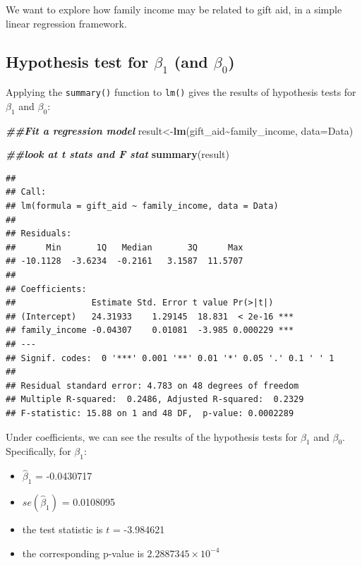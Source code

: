 \documentclass[
]{book}
\newenvironment{Shaded}{\begin{snugshade}}{\end{snugshade}}
\newcommand{\AttributeTok}[1]{\textcolor[rgb]{0.13,0.29,0.53}{#1}}
\newcommand{\DocumentationTok}[1]{\textcolor[rgb]{0.56,0.35,0.01}{\textbf{\textit{#1}}}}
\newcommand{\FunctionTok}[1]{\textcolor[rgb]{0.13,0.29,0.53}{\textbf{#1}}}
\newcommand{\NormalTok}[1]{#1}
\newcommand{\OtherTok}[1]{\textcolor[rgb]{0.56,0.35,0.01}{#1}}
\newcommand{\SpecialCharTok}[1]{\textcolor[rgb]{0.81,0.36,0.00}{\textbf{#1}}}
\providecommand{\tightlist}{%
  \setlength{\itemsep}{0pt}\setlength{\parskip}{0pt}}
\begin{document}
We want to explore how family income may be related to gift aid, in a simple linear regression framework.

\hypertarget{hypothesis-test-for-beta_1-and-beta_0}{%
\subsection*{\texorpdfstring{Hypothesis test for \(\beta_1\) (and \(\beta_0\))}{Hypothesis test for \textbackslash beta\_1 (and \textbackslash beta\_0)}}\label{hypothesis-test-for-beta_1-and-beta_0}}

Applying the \texttt{summary()} function to \texttt{lm()} gives the results of hypothesis tests for \(\beta_1\) and \(\beta_0\):

\begin{Shaded}
\begin{Highlighting}[]
\DocumentationTok{\#\#Fit a regression model}
\NormalTok{result}\OtherTok{\textless{}{-}}\FunctionTok{lm}\NormalTok{(gift\_aid}\SpecialCharTok{\textasciitilde{}}\NormalTok{family\_income, }\AttributeTok{data=}\NormalTok{Data)}

\DocumentationTok{\#\#look at t stats and F stat}
\FunctionTok{summary}\NormalTok{(result)}
\end{Highlighting}
\end{Shaded}

\begin{verbatim}
## 
## Call:
## lm(formula = gift_aid ~ family_income, data = Data)
## 
## Residuals:
##      Min       1Q   Median       3Q      Max 
## -10.1128  -3.6234  -0.2161   3.1587  11.5707 
## 
## Coefficients:
##               Estimate Std. Error t value Pr(>|t|)    
## (Intercept)   24.31933    1.29145  18.831  < 2e-16 ***
## family_income -0.04307    0.01081  -3.985 0.000229 ***
## ---
## Signif. codes:  0 '***' 0.001 '**' 0.01 '*' 0.05 '.' 0.1 ' ' 1
## 
## Residual standard error: 4.783 on 48 degrees of freedom
## Multiple R-squared:  0.2486, Adjusted R-squared:  0.2329 
## F-statistic: 15.88 on 1 and 48 DF,  p-value: 0.0002289
\end{verbatim}

Under coefficients, we can see the results of the hypothesis tests for \(\beta_1\) and \(\beta_0\). Specifically, for \(\beta_1\):

\begin{itemize}
\tightlist
\item
  \(\hat{\beta}_1\) = -0.0430717
\item
  \(se(\hat{\beta}_1)\) = 0.0108095
\item
  the test statistic is \(t\) = -3.984621
\item
  the corresponding p-value is \ensuremath{2.2887345\times 10^{-4}}
\end{itemize}
\end{document}
